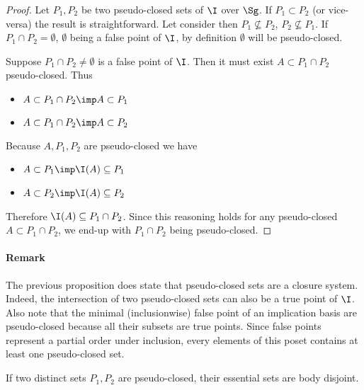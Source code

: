 \begin{proof} Let $P_1, P_2$ be two pseudo-closed sets of $\I$ over $\Sg$. If
$P_1 \subset P_2$ (or vice-versa) the result is straightforward. Let consider
then $P_1 \nsubseteq P_2$, $P_2 \nsubseteq P_1$. If $P_1 \cap P_2 = \emptyset$, 
$\emptyset$ being a false point of $\I$, by  definition $\emptyset$ will be 
pseudo-closed.

Suppose $P_1 \cap P_2 \neq \emptyset$ is a false point of $\I$. Then it must 
exist $A \subset P_1 \cap P_2$ pseudo-closed. Thus
\begin{itemize}
	\item $A \subset P_1 \cap P_2 \imp A \subset P_1$ 
	\item $A \subset P_1 \cap P_2 \imp A \subset P_2$
\end{itemize}
\noindent Because $A, P_1, P_2$ are pseudo-closed we have
\begin{itemize}
	\item $A \subset P_1 \imp \I(A) \subseteq P_1$
	\item $A \subset P_2 \imp \I(A) \subseteq P_2$
\end{itemize}
\noindent Therefore $\I(A) \subseteq P_1 \cap P_2$. Since this reasoning holds 
for any pseudo-closed $A \subset P_1 \cap P_2$, we end-up with $P_1 \cap P_2$ 
being pseudo-closed.


	
\end{proof}

\paragraph{Remark} The previous proposition does  state that
pseudo-closed sets are a closure system. Indeed, the intersection of two 
pseudo-closed sets can also be a true point of $\I$. Also note that the minimal
(inclusionwise) false point of an implication basis are pseudo-closed because
all their subsets are true points. Since false points represent a partial order
under inclusion, every elements of this poset contains at least one 
pseudo-closed set.

\begin{proposition} \label{prop:let.imp_pc_bd}
If two distinct sets $P_1, P_2$ are pseudo-closed, their essential 
sets are body disjoint. 
	
\end{proposition}

